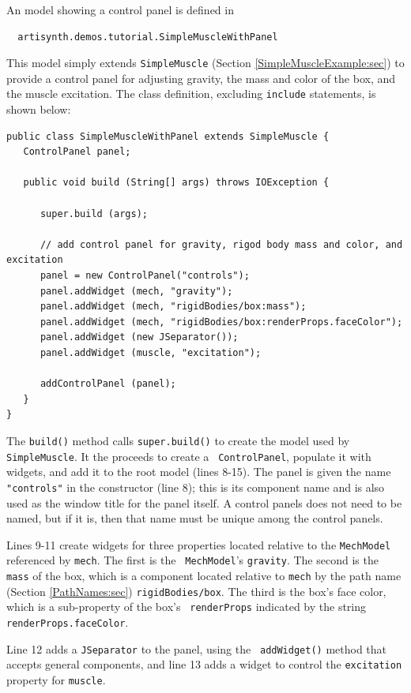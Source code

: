 An model showing a control panel is defined in
%
\begin{verbatim}
  artisynth.demos.tutorial.SimpleMuscleWithPanel
\end{verbatim}
%
This model simply extends {\tt SimpleMuscle} (Section
\ref{SimpleMuscleExample:sec}) to provide a control panel for
adjusting gravity, the mass and color of the box, and the muscle
excitation. The class definition, excluding {\tt include} statements,
is shown below:
%
\lstset{numbers=left}
\begin{lstlisting}
public class SimpleMuscleWithPanel extends SimpleMuscle {
   ControlPanel panel;

   public void build (String[] args) throws IOException {

      super.build (args);

      // add control panel for gravity, rigod body mass and color, and excitation
      panel = new ControlPanel("controls");
      panel.addWidget (mech, "gravity");
      panel.addWidget (mech, "rigidBodies/box:mass");
      panel.addWidget (mech, "rigidBodies/box:renderProps.faceColor");
      panel.addWidget (new JSeparator());
      panel.addWidget (muscle, "excitation");

      addControlPanel (panel);
   }
}
\end{lstlisting}
\lstset{numbers=none}
%
The {\tt build()} method calls {\tt super.build()} to create the model
used by {\tt SimpleMuscle}. It the proceeds to create a {\tt
ControlPanel}, populate it with widgets, and add
it to the root model (lines 8-15). The panel is given the name {\tt
"controls"} in the constructor (line 8); this is its component name
and is also used as the window title for the panel itself. A control
panels does not need to be named, but if it is, then that name must be
unique among the control panels.

Lines 9-11 create widgets for three properties located relative to the
{\tt MechModel} referenced by {\tt mech}. The first is the {\tt
MechModel}'s {\tt gravity}. The second is the {\tt mass} of the box,
which is a component located relative to {\tt mech} by the path name
(Section \ref{PathNames:sec}) {\tt rigidBodies/box}. The third is the
box's face color, which is a sub-property of the box's {\tt
renderProps} indicated by the string {\tt renderProps.faceColor}.

Line 12 adds a {\tt JSeparator} to the panel, using the {\tt
addWidget()} method that accepts general components, and line 13 adds
a widget to control the {\tt excitation} property for {\tt muscle}.

